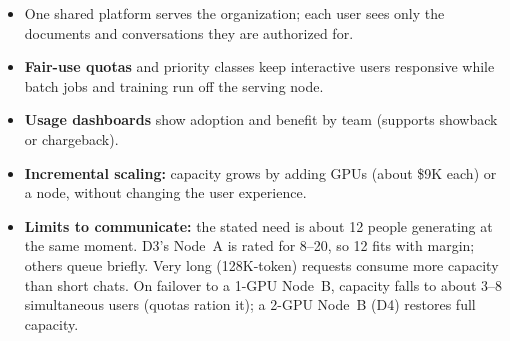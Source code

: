 
\begin{itemize}
  \item One shared platform serves the organization; each user sees only the documents
    and conversations they are authorized for.
  \item \textbf{Fair-use quotas} and priority classes keep interactive users responsive
    while batch jobs and training run off the serving node.
  \item \textbf{Usage dashboards} show adoption and benefit by team (supports showback
    or chargeback).
  \item \textbf{Incremental scaling:} capacity grows by adding GPUs (about \$9K each) or a
    node, without changing the user experience.
  \item \textbf{Limits to communicate:} the stated need is about 12 people generating at the
    same moment. D3's Node~A is rated for 8--20, so 12 fits with margin; others queue
    briefly. Very long (128K-token) requests consume more capacity than short chats. On
    failover to a 1-GPU Node~B, capacity falls to about 3--8 simultaneous users (quotas
    ration it); a 2-GPU Node~B (D4) restores full capacity.
\end{itemize}
